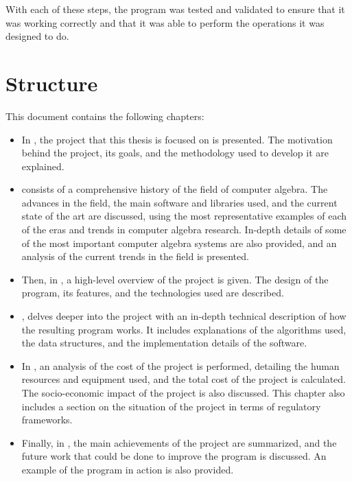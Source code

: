 With each of these steps, the program was tested and validated to ensure that it was working correctly and that it was able to perform the operations it was designed to do.

\section{Structure}\label{sec:structure}
This document contains the following chapters:
\begin{itemize}
  \item In , the project that this thesis is focused on is presented. The motivation behind the project, its goals, and the methodology used to develop it are explained.
  \item {} consists of a comprehensive history of the field of computer algebra. The advances in the field, the main software and libraries used, and the current state of the art are discussed, using the most representative examples of each of the eras and trends in computer algebra research. In-depth details of some of the most important computer algebra systems are also provided, and an analysis of the current trends in the field is presented.
  \item Then, in , a high-level overview of the project is given. The design of the program, its features, and the technologies used are described.
  \item {}, delves deeper into the project with an in-depth technical description of how the resulting program works. It includes explanations of the algorithms used, the data structures, and the implementation details of the software.
  \item In , an analysis of the cost of the project is performed, detailing the human resources and equipment used, and the total cost of the project is calculated. The socio-economic impact of the project is also discussed. This chapter also includes a section on the situation of the project in terms of regulatory frameworks.
  \item Finally, in , the main achievements of the project are summarized, and the future work that could be done to improve the program is discussed. An example of the program in action is also provided.
\end{itemize}
